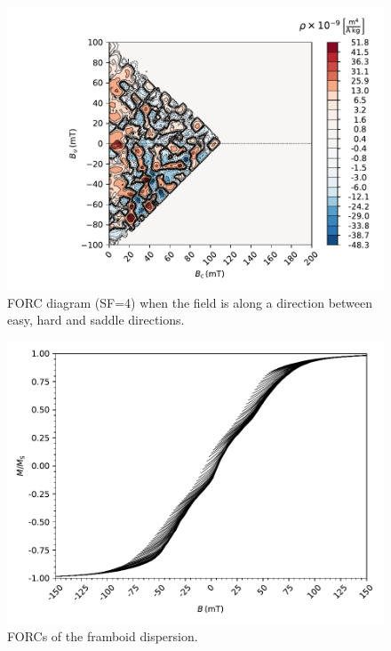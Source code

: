 \begin{figure}
\centering
\includegraphics[width=\textwidth]{research-4/figs/FORC_53_SF4.pdf}
\caption[FORC diagram when the field is along a direction between easy, hard and saddle directions]{FORC diagram (SF=4) when the field is along a direction between easy, hard and saddle directions.}
\label{FIG_09}
\end{figure}

\begin{figure}
\centering
\includegraphics[width=\textwidth]{research-4/figs/BM_fram_avg.pdf}
\caption[FORCs of the framboid dispersion]{FORCs of the framboid dispersion.}
\label{FIG_10}
\end{figure}

